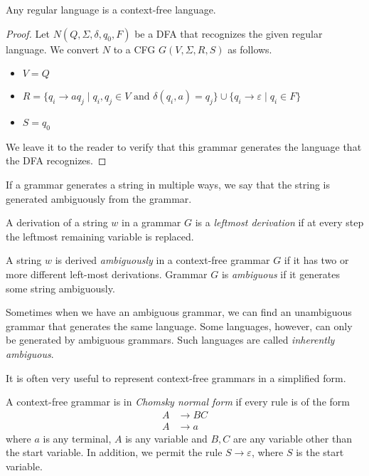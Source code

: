 \begin{theorem}
Any regular language is a context-free language.
\end{theorem}
\begin{proof}
Let $N(Q,\Sigma,\delta,q_0,F)$ be a DFA that recognizes the given regular language. We convert $N$ to a CFG $G(V,\Sigma,R,S)$ as follows.
\begin{itemize}
    \item $V=Q$
    \item $R=\{q_i\to aq_j\mid q_i,q_j\in V \text{ and } \delta(q_i,a)=q_j\} \cup\{q_i\to\varepsilon\mid q_i\in F\}$
    \item $S=q_0$
\end{itemize}
We leave it to the reader to verify that this grammar generates the language that the DFA recognizes.
\end{proof}

If a grammar generates a string in multiple ways, we say that the string is generated ambiguously from the grammar.
\begin{definition}
A derivation of a string $w$ in a grammar $G$ is a \textit{leftmost derivation} if at every step the leftmost remaining variable is replaced.
\end{definition}

\begin{definition}
A string $w$ is derived \textit{ambiguously} in a context-free grammar $G$ if it has two or more different left-most derivations. Grammar $G$ is \textit{ambiguous} if it generates some string ambiguously.
\end{definition}

Sometimes when we have an ambiguous grammar, we can find an unambiguous grammar that generates the same language. Some languages, however, can only be generated by ambiguous grammars. Such languages are called \textit{inherently ambiguous}.

\vspace{3mm}
It is often very useful to represent context-free grammars in a simplified form.

\begin{definition}
A context-free grammar is in \textit{Chomsky normal form} if every rule is of the form
\begin{align*}
    A&\to BC \\
    A&\to a
\end{align*}
where $a$ is any terminal, $A$ is any variable and $B,C$ are any variable other than the start variable. In addition, we permit the rule $S\to\varepsilon$, where $S$ is the start variable.
\end{definition}

